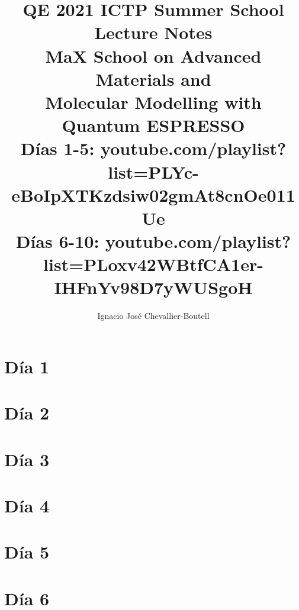 \documentclass[12pt,final,twoside,onecolumn,openright,titlepage]{book}
\title{\Huge \textbf{QE 2021 ICTP Summer School} \\
\Large \textbf{Lecture Notes} \\
\normalsize MaX School on Advanced Materials and \\ Molecular Modelling with Quantum ESPRESSO \\
\small \textbf{Días 1-5:} youtube.com/playlist?list=PLYc-eBoIpXTKzdsiw02gmAt8cnOe011Ue \\
\small \textbf{Días 6-10:} youtube.com/playlist?list=PLoxv42WBtfCA1er-IHFnYv98D7yWUSgoH}
\author{Ignacio José Chevallier-Boutell}
\date{}%
\numberwithin{equation}{section}  %
\begin{document}
    \maketitle
    \thispagestyle{empty}

    \frontmatter
        \pagestyle{fancy}
        \fancyhead{}
        \renewcommand{\headrulewidth}{1pt}
        \tableofcontents  %

    \mainmatter
        \pagestyle{fancy}
        \fancyhead{}
        \renewcommand{\headrulewidth}{1pt}


    \chapter{Día 1}

      

    \chapter{Día 2}

      

    \chapter{Día 3}

      

    \chapter{Día 4}

      

    \chapter{Día 5}

      

    \chapter{Día 6}

      
\end{document}
